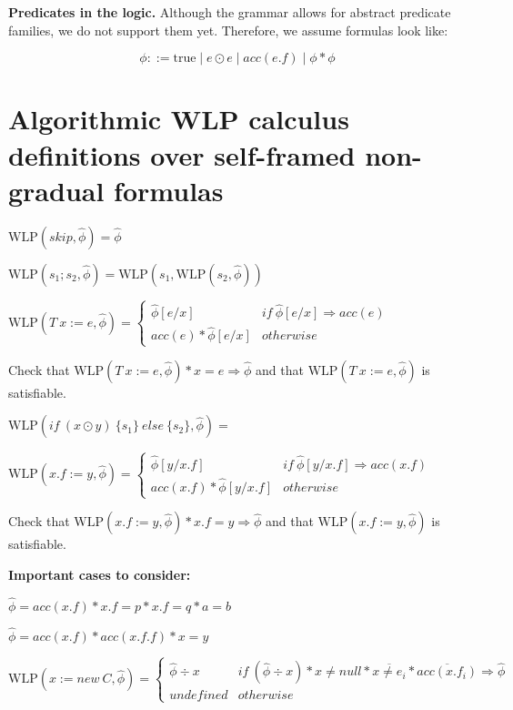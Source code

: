 \documentclass {article}
\newcommand{\true}{\text{true}}
\newcommand{\eif}[3]{if \ ( #1 ) \ \{ #2 \} \ else \ \{#3\}}
\newcommand{\fphi}{\widehat{\phi}}
\newcommand{\imp}{\Rightarrow}
\newcommand{\wlp}[2]{\text{WLP}(#1,#2)}
\begin{document}
\textbf{Predicates in the logic.} Although the grammar allows for abstract predicate families, we do not support them yet. Therefore, we assume formulas look like:

$$ \phi ::= \true \mid e \odot e \mid acc(e.f) \mid \phi \ast \phi $$

\section{Algorithmic WLP calculus definitions over self-framed non-gradual formulas}
\hspace{0.5cm}

$\wlp{skip}{\fphi} = \fphi  $

\vspace{0.5cm}

$\wlp{s_1;s_2}{\fphi} = \wlp{s_1}{\wlp{s_2}{\fphi}} $

\vspace{0.5cm}

$\wlp{T \ x := e}{\fphi} = 
	\begin{cases}
	 \fphi[e/x] & if \ \fphi[e/x] \imp acc(e) \\
	 acc(e) \ast \fphi[e/x] & otherwise
	\end{cases} $

Check that $\wlp{T \ x := e}{\fphi} \ast x = e \imp \fphi$ and that $\wlp{T \ x := e}{\fphi}$ is satisfiable.

\vspace{0.5cm}

$\wlp{\eif{x \odot y}{s_1}{s_2}}{\fphi} = $

\vspace{0.5cm}

$\wlp{x.f := y}{\fphi} =  
	\begin{cases}
	 \fphi[y/x.f] & if \ \fphi[y/x.f] \imp acc(x.f) \\
	 acc(x.f) \ast \fphi[y/x.f] & otherwise
	\end{cases}$

Check that $\wlp{x.f := y}{\fphi} \ast x.f = y \imp \fphi$ and that $\wlp{x.f := y}{\fphi}$ is satisfiable.

\textbf{Important cases to consider:}

$\fphi = acc(x.f) \ast x.f = p \ast x.f = q \ast a = b $

$\fphi = acc(x.f) \ast acc(x.f.f) \ast x = y $

\vspace{0.5cm}

$\wlp{x := new\ C}{\fphi} = 
	\begin{cases}
	 \fphi \div x & if \ (\fphi \div x) \ast x \neq null \ast \overline{x \neq e_i} \ast \overline{acc(x.f_i)} \imp \fphi \\
	 undefined & otherwise
	\end{cases}$ 
\end{document}
